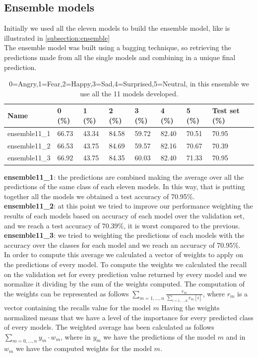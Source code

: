 \documentclass[10pt,twocolumn,letterpaper]{article}
\begin{document}
\subsection{Ensemble models}
Initially we used all the eleven models to build the ensemble model, like is illustrated in \ref{subsection:ensemble}\\
The ensemble model was built using a bagging technique, so retrieving the predictions made from all the single models and combining in a unique final prediction. 
\def\arraystretch{1.2}
\begin{table}[H]
   \scriptsize
   \begin{tabular}{L{1.1cm}C{0.5cm}C{0.5cm}C{0.5cm}C{0.5cm}C{0.5cm}C{0.5cm}C{0.8cm}}
      \hline
      Name          & 0 (\%) & 1 (\%) & 2 (\%) & 3 (\%) & 4 (\%) & 5 (\%) & Test set (\%) \\
      \hline\hline
      ensemble11\_1 & 66.73  & 43.34  & 84.58  & 59.72  & 82.40  & 70.51  & 70.95         \\
      ensemble11\_2 & 66.53  & 43.75  & 84.69  & 59.57  & 82.16  & 70.67  & 70.39         \\
      ensemble11\_3 & 66.92  & 43.75  & 84.35  & 60.03  & 82.40  & 71.33  & 70.95         \\
      \hline
   \end{tabular}
   \caption{ 0=Angry,1=Fear,2=Happy,3=Sad,4=Surprised,5=Neutral, in this ensemble we use all the 11 models developed.}
   \label{table:accuracymodelli}
\end{table}
\noindent\textbf{ensemble11\_1}: the predictions are combined making the average over all the predictions of the same class of each eleven models. In this way, that is putting together all the models we obtained a test accuracy of 70.95\%.\\
\textbf{ensemble11\_2}: at this point we tried to improve our performance weighting the results of each models based on accuracy of each model over the validation set, and we reach a test accuracy of 70.39\%, it is worst compared to the previous. \\
\textbf{ensemble11\_3}: we tried to weighting the predictions of each models with the accuracy over the classes for each model and we reach an accuracy of 70.95\%.\\
In order to compute this average we calculated a vector of weights to apply on the predictions of every model. To compute the weights we calculated the recall on the validation set for every prediction value returned by every model and we normalize it dividing by the sum of the weights computed.
The computation of the weights can be represented as follows
$\sum_{m=1,...,n} \frac{r_{m}}{\sum_{i=1,...,6} r_{m}[i]}$, where $r_m$ is a vector containing the recalls value for the model $m$
Having the weights normalized means that we have a level of the importance for every predicted class of every models.
The weighted average has been calculated as follows $\sum_{m=0,...,n} y_m\cdot w_m$, where in $y_m$ we have the predictions of the model $m$
and in $w_m$ we have the computed weights for the model $m$.
\end{document}

